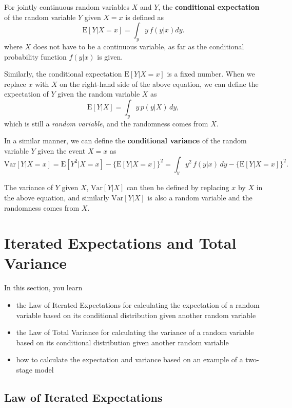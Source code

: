 \documentclass[]{book}
\providecommand{\tightlist}{%
  \setlength{\itemsep}{0pt}\setlength{\parskip}{0pt}}
\theoremstyle{definition}
\theoremstyle{definition}
\theoremstyle{definition}
\theoremstyle{remark}
\begin{document}
For jointly continuous random variables \(X\) and \(Y\), the
\textbf{conditional expectation} of the random variable \(Y\) given
\(X=x\) is defined as \[\mathrm{E}[Y|X=x]=\int_y y\,f(y|x)dy.\] where
\(X\) does not have to be a continuous variable, as far as the
conditional probability function \(f(y|x)\) is given.

Similarly, the conditional expectation \(\mathrm{E}[Y|X=x]\) is a fixed
number. When we replace \(x\) with \(X\) on the right-hand side of the
above equation, we can define the expectation of \(Y\) given the random
variable \(X\) as \[\mathrm{E}[Y|X]=\int_y y\,p(y|X)\,dy,\] which is
still a \emph{random variable}, and the randomness comes from \(X\).

In a similar manner, we can define the \textbf{conditional variance} of
the random variable \(Y\) given the event \(X=x\) as
\[\mathrm{Var}[Y|X=x]=\mathrm{E}[Y^2|X=x]-\{\mathrm{E}[Y|X=x]\}^2=\int_y y^2\,f(y|x)\,dy-\{\mathrm{E}[Y|X=x]\}^2.\]

The variance of \(Y\) given \(X\), \(\mathrm{Var}[Y|X]\) can then be
defined by replacing \(x\) by \(X\) in the above equation, and similarly
\(\mathrm{Var}[Y|X]\) is also a random variable and the randomness comes
from \(X\).

\section{Iterated Expectations and Total Variance}\label{S:AppB:IE}

In this section, you learn

\begin{itemize}
\tightlist
\item
  the Law of Iterated Expectations for calculating the expectation of a
  random variable based on its conditional distribution given another
  random variable
\item
  the Law of Total Variance for calculating the variance of a random
  variable based on its conditional distribution given another random
  variable
\item
  how to calculate the expectation and variance based on an example of a
  two-stage model
\end{itemize}

\subsection{Law of Iterated
Expectations}\label{law-of-iterated-expectations}
\end{document}

